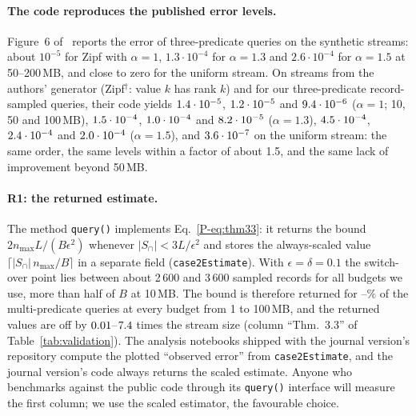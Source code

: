 \documentclass[sigconf,review,anonymous]{acmart}
\newcommand{\pref}[1]{\ref{P-#1}}
\begin{document}
\paragraph{The code reproduces the published error levels.} Figure~6 of~\cite{omni} reports the error of
three-predicate queries on the synthetic streams: about $10^{-5}$ for Zipf with $\alpha=1$,
$1.3\cdot10^{-4}$ for $\alpha=1.3$ and $2.6\cdot10^{-4}$ for $\alpha=1.5$ at 50--200\,MB, and close to
zero for the uniform stream. On streams from the authors' generator (Zipf$^\dagger$: value $k$ has rank
$k$) and for our three-predicate record-sampled queries, their code yields $1.4\cdot10^{-5}$,
$1.2\cdot10^{-5}$ and $9.4\cdot10^{-6}$ ($\alpha=1$; 10, 50 and 100\,MB),
$1.5\cdot10^{-4}$, $1.0\cdot10^{-4}$ and $8.2\cdot10^{-5}$
($\alpha=1.3$), $4.5\cdot10^{-4}$, $2.4\cdot10^{-4}$ and
$2.0\cdot10^{-4}$ ($\alpha=1.5$), and $3.6\cdot10^{-7}$ on the uniform stream: the same
order, the same levels within a factor of about 1.5, and the same lack of improvement beyond 50\,MB.

\paragraph{R1: the returned estimate.} The method \texttt{query()} implements Eq.~\pref{eq:thm33}: it
returns the bound $2n_{\max}L/(B\epsilon^2)$ whenever $|S_\cap|<3L/\epsilon^2$ and stores the always-scaled
value $\lceil|S_\cap|\,n_{\max}/B\rceil$ in a separate field (\texttt{case2Estimate}). With
$\epsilon=\delta=0.1$ the switch-over point lies between about 2\,600 and 3\,600 sampled records for all
budgets we use, more than half of $B$ at 10\,MB. The bound is therefore returned for
\NumValBoundFracLo--\NumValBoundFracHi\% of the multi-predicate queries at every budget from 1 to
100\,MB, and the returned values are off by $0.01$--$7.4$ times the stream size
(column ``Thm.~3.3'' of Table~\ref{tab:validation}). The analysis notebooks shipped with the journal
version's repository compute the plotted ``observed error'' from \texttt{case2Estimate}, and the journal
version's code always returns the scaled estimate. Anyone who benchmarks against the public code through
its \texttt{query()} interface will measure the first column; we use the scaled estimator, the favourable
choice.
\end{document}
